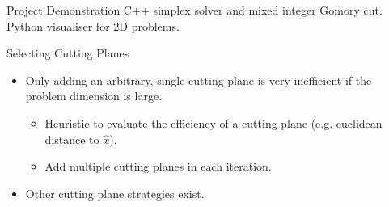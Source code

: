 \begin{frame}{Project Demonstration}
C++ simplex solver and mixed integer Gomory cut. Python visualiser for 2D problems.

%    
\end{frame}

\begin{frame}{Selecting Cutting Planes}
\begin{itemize}[<+->]
\item Only adding an arbitrary, single cutting plane is very inefficient if the problem dimension is large.
\begin{itemize}
\item Heuristic to evaluate the efficiency of a cutting plane (e.g. euclidean distance to $\hat{x}$).
\item Add multiple cutting planes in each iteration.
\end{itemize}
\item Other cutting plane strategies exist.
\end{itemize}
\end{frame}